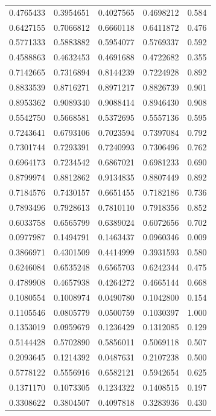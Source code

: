 \documentclass[
  letterpaper,
  DIV=11,
  numbers=noendperiod]{scrartcl}
\begin{document}
\begin{longtable}[]{@{}rrrrr@{}}
0.4765433 & 0.3954651 & 0.4027565 & 0.4698212 & 0.584 \\
0.6427155 & 0.7066812 & 0.6660118 & 0.6411872 & 0.476 \\
0.5771333 & 0.5883882 & 0.5954077 & 0.5769337 & 0.592 \\
0.4588863 & 0.4632453 & 0.4691688 & 0.4722682 & 0.355 \\
0.7142665 & 0.7316894 & 0.8144239 & 0.7224928 & 0.892 \\
0.8833539 & 0.8716271 & 0.8971217 & 0.8826739 & 0.901 \\
0.8953362 & 0.9089340 & 0.9088414 & 0.8946430 & 0.908 \\
0.5542750 & 0.5668581 & 0.5372695 & 0.5557136 & 0.595 \\
0.7243641 & 0.6793106 & 0.7023594 & 0.7397084 & 0.792 \\
0.7301744 & 0.7293391 & 0.7240993 & 0.7306496 & 0.762 \\
0.6964173 & 0.7234542 & 0.6867021 & 0.6981233 & 0.690 \\
0.8799974 & 0.8812862 & 0.9134835 & 0.8807449 & 0.892 \\
0.7184576 & 0.7430157 & 0.6651455 & 0.7182186 & 0.736 \\
0.7893496 & 0.7928613 & 0.7810110 & 0.7918356 & 0.852 \\
0.6033758 & 0.6565799 & 0.6389024 & 0.6072656 & 0.702 \\
0.0977987 & 0.1494791 & 0.1463437 & 0.0960346 & 0.009 \\
0.3866971 & 0.4301509 & 0.4414999 & 0.3931593 & 0.580 \\
0.6246084 & 0.6535248 & 0.6565703 & 0.6242344 & 0.475 \\
0.4789908 & 0.4657938 & 0.4264272 & 0.4665144 & 0.668 \\
0.1080554 & 0.1008974 & 0.0490780 & 0.1042800 & 0.154 \\
0.1105546 & 0.0805779 & 0.0500759 & 0.1030397 & 1.000 \\
0.1353019 & 0.0959679 & 0.1236429 & 0.1312085 & 0.129 \\
0.5144428 & 0.5702890 & 0.5856011 & 0.5069118 & 0.507 \\
0.2093645 & 0.1214392 & 0.0487631 & 0.2107238 & 0.500 \\
0.5778122 & 0.5556916 & 0.6582121 & 0.5942654 & 0.625 \\
0.1371170 & 0.1073305 & 0.1234322 & 0.1408515 & 0.197 \\
0.3308622 & 0.3804507 & 0.4097818 & 0.3283936 & 0.430 \\

\end{longtable}
\end{document}
